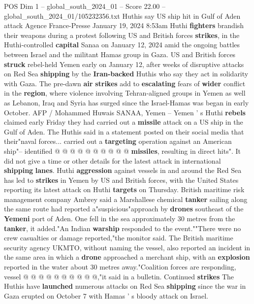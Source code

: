 \begin{textsample}{POS Dim 1 – global\_south\_2024\_01 – Score 22.00 – global\_south\_2024\_01/105232356.txt}  \label{ex:f1_pos_109}
Huthis say US ship hit in Gulf of Aden attack Agence France-Presse January 19, 2024 8:53am Huthi \textbf{fighters} brandish their weapons during a protest following US and British forces \textbf{strikes}, in the Huthi-controlled \textbf{capital} Sanaa on January 12, 2024 amid the ongoing battles between Israel and the militant Hamas group in Gaza.
US and British forces \textbf{struck} rebel-held Yemen early on January 12, after weeks of disruptive attacks on Red Sea \textbf{shipping} by the \textbf{Iran-backed} Huthis who say they act in solidarity with Gaza.
The pre-dawn \textbf{air} \textbf{strikes} add to \textbf{escalating} fears of \textbf{wider} conflict in the \textbf{region}, where violence involving Tehran-aligned groups in Yemen as well as Lebanon, Iraq and Syria has surged since the Israel-Hamas was began in early October.
AFP / Mohammed Huwais SANAA, Yemen -- Yemen ' s Huthi \textbf{rebels} claimed early Friday they had carried out a \textbf{missile} attack on a US ship in the Gulf of Aden.
The Huthis said in a statement posted on their social media that their"naval forces... carried out a \textbf{targeting} operation against an American ship"-- identified @ @ @ @ @ @ @ @ @ @ \textbf{missiles}, resulting in direct hits".
It did not give a time or other details for the latest attack in international \textbf{shipping} \textbf{lanes}.
Huthi \textbf{aggression} against vessels in and around the Red Sea has led to \textbf{strikes} in Yemen by US and British forces, with the United States reporting its latest attack on Huthi \textbf{targets} on Thursday.
British maritime risk management company Ambrey said a Marshallese chemical \textbf{tanker} sailing along the same route had reported a"suspicious"approach by \textbf{drones} southeast of the \textbf{Yemeni} port of Aden.
One fell in the sea approximately 30 metres from the \textbf{tanker}, it added."An Indian \textbf{warship} responded to the event.""There were no crew casualties or damage reported,"the monitor said.
The British maritime security agency UKMTO, without naming the vessel, also reported an incident in the same area in which a \textbf{drone} approached a merchant ship, with an \textbf{explosion} reported in the water about 30 metres away."Coalition forces are responding, vessel @ @ @ @ @ @ @ @ @ @,"it said in a bulletin.
Continued \textbf{strikes} The Huthis have \textbf{launched} numerous attacks on Red Sea \textbf{shipping} since the war in Gaza erupted on October 7 with Hamas ' s bloody attack on Israel.

\end{textsample}
